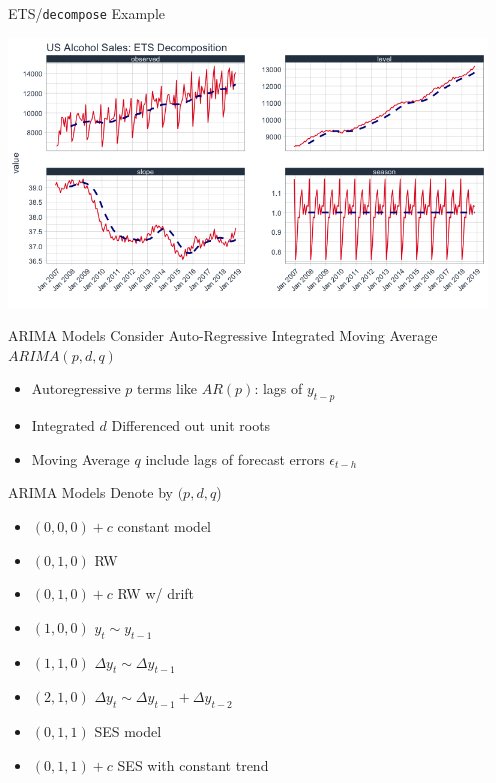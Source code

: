 \documentclass[aspectratio=169]{beamer}
\begin{document}
\begin{frame}{ETS/\texttt{decompose} Example}
\begin{center}
\includegraphics[width=5in]{./resources/ets_decomp.png}
\end{center}

\end{frame}

\begin{frame}{ARIMA Models}
Consider \alert{Auto-Regressive Integrated Moving Average} $ARIMA(p,d,q)$
\begin{itemize}
\item \alert{Autoregressive} $p$ terms like $AR(p)$: lags of $y_{t-p}$
\item \alert{Integrated} $d$ Differenced out unit roots 
\item \alert{Moving Average} $q$ include lags of forecast errors $\epsilon_{t-h}$
\end{itemize}
\end{frame}

\begin{frame}{ARIMA Models}
Denote by $(p,d,q$)
\begin{itemize}
\item $(0,0,0) + c$ constant model
\item $(0,1,0)$ RW
\item $(0,1,0)+ c$ RW w/ drift
\item $(1,0,0)$ $y_t \sim y_{t-1}$
\item $(1,1,0)$ $\Delta y_t \sim \Delta y_{t-1}$
\item $(2,1,0)$ $\Delta y_t \sim \Delta y_{t-1}+\Delta y_{t-2}$
\item $(0,1,1)$ SES model
\item $(0,1,1)+c$ SES with constant trend
\end{itemize}
\end{frame}
\end{document}

